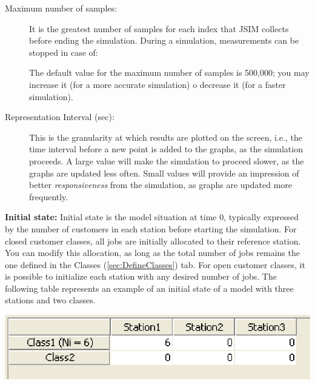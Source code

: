 \begin{description*}
\begin{description}
\item [Maximum number of samples:] It is the greatest number of samples for each index that JSIM collects before ending the simulation. During a simulation, measurements can be stopped in case of:
The default value for the maximum number of samples is 500,000; you may increase it (for a more accurate simulation) o decrease it (for a faster simulation).
\item [Representation Interval (sec):] This is the granularity at which results are plotted on the screen, i.e., the time interval before a new point is added to the graphs, as the simulation proceeds. A large value will make the simulation to proceed slower, as the graphs are updated less often. Small values will provide an impression of better \emph{responsiveness} from the simulation, as graphs are updated more frequently.
\end{description}
\textbf{Initial state:}
Initial state is the model situation at time 0, typically expressed by the number of customers in each station before starting the simulation. For closed customer classes, all jobs are initially allocated to their reference station. You can modify this allocation, as long as  the total number of jobs remains the one defined in the
Classes (\ref{sec:DefineClasses}) tab. 
For open customer classes, it is possible to initialize each station with any desired number of jobs. The following table represents an example of an initial state of a model with three stations and two classes.
\begin{center}
\includegraphics[scale=.5]{img/jsim/bottom_section.eps}
\end{center}


\end{description*}
